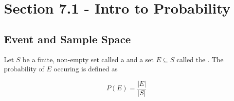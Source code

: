\documentclass[../../Main.tex]{subfiles}
\begin{document}
\section{Section 7.1 - Intro to Probability}

\subsection{Event and Sample Space}

\begin{definition}
    Let $S$ be a finite, non-empty set called a  and a set $E \subseteq S$ called the .
    The probability of $E$ occuring is defined as

    $$P(E) = \frac{|E|}{|S|}$$
\end{definition}
\end{document}
